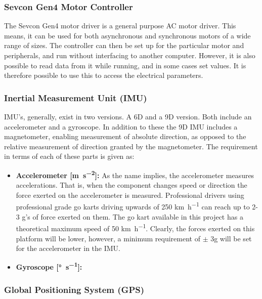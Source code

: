 \subsubsection*{Sevcon Gen4 Motor Controller}
\label{sec:interfacin_with_sevcon}

The Sevcon Gen4 motor driver is a general purpose AC motor driver. 
This means, it can be used for both asynchronous and synchronous motors of a wide range of sizes.
The controller can then be set up for the particular motor and peripherals, and run without interfacing to another computer.
However, it is also possible to read data from it while running, and in some cases set values.
It is therefore possible to use this to access the electrical parameters. \\


\subsubsection*{Inertial Measurement Unit (IMU)}
\label{sec:imu}
IMU's, generally, exist in two versions.
A 6D and a 9D version.
Both include an accelerometer and a gyroscope.
In addition to these the 9D IMU includes a magnetometer, enabling measurement of absolute direction, as opposed to the relative measurement of direction granted by the magnetometer.
The requirement in terms of each of these parts is given as:
\begin{itemize}
	\item \textbf{Accelerometer [\si{\metre\per\second^2}]:} As the name implies, the accelerometer measures accelerations.
	That is, when the component changes speed or direction the force exerted on the accelerometer is measured.
	Professional drivers using professional grade go karts driving upwards of 250 \si{\kilo\metre\per\hour} can reach up to 2-3 g's of force exerted on them.
	The go kart available in this project has a theoretical maximum speed of 50 \si{\kilo\metre\per\hour}.
	Clearly, the forces exerted on this platform will be lower, however, a minimum requirement of $\pm$ 3g will be set for the accelerometer in the IMU.
	\item \textbf{Gyroscope [\si{\degree\per\second}]:} 
\end{itemize}

\subsubsection*{Global Positioning System (GPS)}


